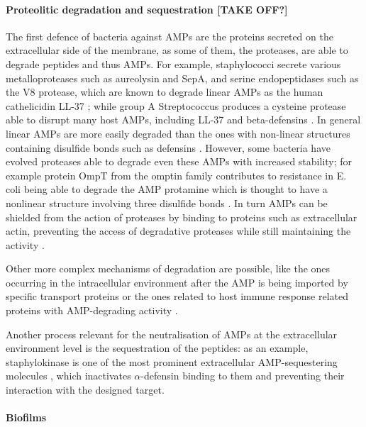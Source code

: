 \paragraph{Proteolitic degradation and sequestration [TAKE OFF?]}
The first defence of bacteria against AMPs are the proteins secreted on the extracellular side of the membrane, as some of them, the proteases, are able to degrade peptides and thus AMPs.
%
For example, staphylococci secrete various metalloproteases such as aureolysin and SepA, and serine endopeptidases such as the V8 protease, which are known to degrade linear AMPs as the human cathelicidin LL-37 \cite{Sieprawska-Lupa2004,Teufel1993}; while group A Streptococcus produces a cysteine protease able to disrupt many host AMPs, including LL-37 and beta-defensins \cite{Schmidtchen2002,Baranska-Rybak2006,Nelson2011,Frick2011}.
%
In general linear AMPs are more easily degraded than the ones with non-linear structures containing disulfide bonds\cite{Peschel2006} such as defensins \cite{Selsted1989}.
However, some bacteria have evolved proteases able to degrade even these AMPs with increased stability; for example protein OmpT from the omptin family contributes to resistance in E. coli being able to degrade the AMP protamine \cite{Stumpe1998} which is thought to have a nonlinear structure involving three disulfide bonds \cite{Biegeleisen2006}.
%
In turn AMPs can be shielded from the action of proteases by binding to proteins such as extracellular actin, preventing the access of degradative proteases while still maintaining the activity \cite{Sol2014}.

Other more complex mechanisms of degradation are possible, like the ones occurring in the intracellular environment after the AMP is being imported by specific transport proteins \cite{Groisman1992,Parra-Lopez1993,Mason2005} or the ones related to host immune response related proteins with AMP-degrading activity \cite{Taggart2003}.

Another process relevant for the neutralisation of AMPs at the extracellular environment level is the sequestration of the peptides: as an example, staphylokinase is one of the most prominent extracellular AMP-sequestering molecules \cite{Bokarewa2004,Jin2004}, which inactivates $\alpha$-defensin binding to them and preventing their interaction with the designed target.


\paragraph{Biofilms}

